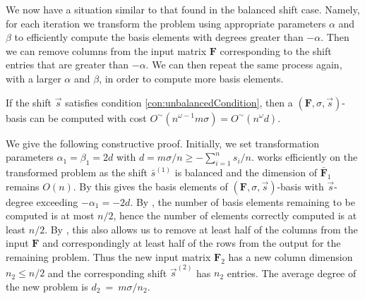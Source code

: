 We now have a situation similar to that found in the balanced shift
case. Namely, for each iteration we transform the problem using appropriate
parameters $\alpha$ and $\beta$ to efficiently compute the basis
elements with degrees greater than $-\alpha$. Then we can remove
columns from the input matrix $\mathbf{F}$ corresponding to the shift
entries that are greater than $-\alpha$. We can then repeat the same
process again, with a larger $\alpha$ and $\beta$, in order to compute
more basis elements. 
\begin{thm}
If the shift $\vec{s}$ satisfies condition \eqref{con:unbalancedCondition},
then a $\left(\mathbf{F},\sigma,\vec{s}\right)$-basis can be computed
with cost $O^{\sim}\left(n^{\omega-1}m\sigma\right)=O^{\sim}\left(n^{\omega}d\right)$. \end{thm}
\begin{pf}
We give the following constructive proof. Initially, we set transformation
parameters $\alpha_{1}=\beta_{1}=2d$ with $d=m\sigma/n\ge-\sum_{i=1}^{n}s_{i}/n$.
 works efficiently on the transformed problem
as the shift $\bar{s}^{\left(1\right)}$ is balanced and the dimension
of $\bar{\mathbf{F}}_{1}$ remains $O\left(n\right)$. By 
this gives the basis elements of $\left(\mathbf{F},\sigma,\vec{s}\right)$-basis
with $\vec{s}$-degree exceeding $-\alpha_{1}=-2d$. By ,
the number of basis elements remaining to be computed is at most $n/2$,
hence the number of elements correctly computed is at least $n/2$.
By , this also allows us to remove
at least half of the columns from the input $\mathbf{F}$ and correspondingly
at least half of the rows from the output for the remaining problem.
Thus the new input matrix $\mathbf{F}_{2}$ has a new column dimension
$n_{2}\le n/2$ and the corresponding shift $\vec{s}^{\left(2\right)}$
has $n_{2}$ entries. The average degree of the new problem is $d_{2}~=~m\sigma/n_{2}$.


\end{pf}
